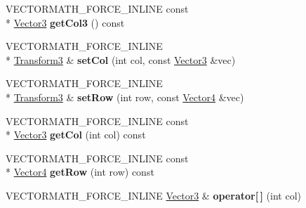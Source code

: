 \begin{DoxyCompactItemize}
\item 
\hypertarget{class_vectormath_1_1_aos_1_1_transform3_a9e0c3206881d35fd5371fa808fced195}{V\+E\+C\+T\+O\+R\+M\+A\+T\+H\+\_\+\+F\+O\+R\+C\+E\+\_\+\+I\+N\+L\+I\+N\+E const \\*
\hyperlink{class_vectormath_1_1_aos_1_1_vector3}{Vector3} {\bfseries get\+Col3} () const }\label{class_vectormath_1_1_aos_1_1_transform3_a9e0c3206881d35fd5371fa808fced195}

\item 
\hypertarget{class_vectormath_1_1_aos_1_1_transform3_a8d467fe91a930b6d408aef5b82a0358e}{V\+E\+C\+T\+O\+R\+M\+A\+T\+H\+\_\+\+F\+O\+R\+C\+E\+\_\+\+I\+N\+L\+I\+N\+E \\*
\hyperlink{class_vectormath_1_1_aos_1_1_transform3}{Transform3} \& {\bfseries set\+Col} (int col, const \hyperlink{class_vectormath_1_1_aos_1_1_vector3}{Vector3} \&vec)}\label{class_vectormath_1_1_aos_1_1_transform3_a8d467fe91a930b6d408aef5b82a0358e}

\item 
\hypertarget{class_vectormath_1_1_aos_1_1_transform3_a3293a9d1716899ffaea6b68636df386d}{V\+E\+C\+T\+O\+R\+M\+A\+T\+H\+\_\+\+F\+O\+R\+C\+E\+\_\+\+I\+N\+L\+I\+N\+E \\*
\hyperlink{class_vectormath_1_1_aos_1_1_transform3}{Transform3} \& {\bfseries set\+Row} (int row, const \hyperlink{class_vectormath_1_1_aos_1_1_vector4}{Vector4} \&vec)}\label{class_vectormath_1_1_aos_1_1_transform3_a3293a9d1716899ffaea6b68636df386d}

\item 
\hypertarget{class_vectormath_1_1_aos_1_1_transform3_ae62a6ed41b657e7eb082e2bbbfbd0070}{V\+E\+C\+T\+O\+R\+M\+A\+T\+H\+\_\+\+F\+O\+R\+C\+E\+\_\+\+I\+N\+L\+I\+N\+E const \\*
\hyperlink{class_vectormath_1_1_aos_1_1_vector3}{Vector3} {\bfseries get\+Col} (int col) const }\label{class_vectormath_1_1_aos_1_1_transform3_ae62a6ed41b657e7eb082e2bbbfbd0070}

\item 
\hypertarget{class_vectormath_1_1_aos_1_1_transform3_aa13f55dab97be692f9ea5b9945b228d0}{V\+E\+C\+T\+O\+R\+M\+A\+T\+H\+\_\+\+F\+O\+R\+C\+E\+\_\+\+I\+N\+L\+I\+N\+E const \\*
\hyperlink{class_vectormath_1_1_aos_1_1_vector4}{Vector4} {\bfseries get\+Row} (int row) const }\label{class_vectormath_1_1_aos_1_1_transform3_aa13f55dab97be692f9ea5b9945b228d0}

\item 
\hypertarget{class_vectormath_1_1_aos_1_1_transform3_adfe27c3c202f7445321c2c19b33cff36}{V\+E\+C\+T\+O\+R\+M\+A\+T\+H\+\_\+\+F\+O\+R\+C\+E\+\_\+\+I\+N\+L\+I\+N\+E \hyperlink{class_vectormath_1_1_aos_1_1_vector3}{Vector3} \& {\bfseries operator\mbox{[}$\,$\mbox{]}} (int col)}\label{class_vectormath_1_1_aos_1_1_transform3_adfe27c3c202f7445321c2c19b33cff36}


\end{DoxyCompactItemize}
